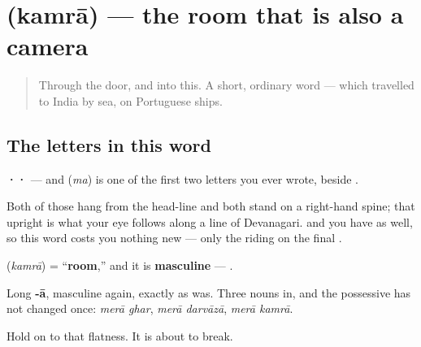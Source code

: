 \section[\texorpdfstring{\hi{कमरा} (kamrā)}{कमरा (kamrā)}]{ (kamrā) — the room that is also a camera}

\label{lesson:HI-C36-kamra}



\begin{quote}
Through the door, and into this. A short, ordinary word — which travelled to India by sea, on Portuguese ships.
\end{quote}

\subsection*{The letters in this word}
\textbf{··} — and \textbf{} (\emph{ma}) is one of the first two letters you ever wrote, beside \textbf{}.

Both of those hang from the head-line and both stand on a right-hand spine; that upright is what your eye follows along a line of Devanagari. \textbf{} and \textbf{} you have as well, so this word costs you nothing new — only the \textbf{} riding on the final \textbf{}.

\begin{grammarlens}[title={Grammar Lens: the lean holds}]
\textbf{} (\emph{kamrā}) = \textquotedblleft{}\textbf{room},\textquotedblright{} and it is \textbf{masculine} — \textbf{ }.

Long \textbf{-ā}, masculine again, exactly as \textbf{} was. Three nouns in, and the possessive has not changed once: \emph{merā ghar}, \emph{merā darvāzā}, \emph{merā kamrā}.

Hold on to that flatness. It is about to break.
\end{grammarlens}


